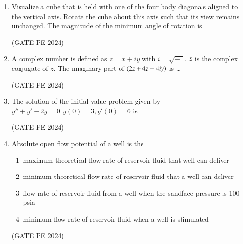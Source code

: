 \documentclass[journal,12pt,onecolumn]{IEEEtran}
\theoremstyle{remark}
\begin{document}
\begin{enumerate}
\item Visualize a cube that is held with one of the four body diagonals aligned to the vertical axis. Rotate the cube about this axis such that its view remains unchanged. The magnitude of the minimum angle of rotation is 
\begin{enumerate}
\end{enumerate}
\hfill{(GATE PE 2024)}

\item A complex number is defined as $z=x+iy$ with $i=\sqrt{-1}$. $\bar{z}$ is the complex conjugate of $z$. The imaginary part of $\left(2z+4\bar z+4iy\right)$ is \dots
\begin{enumerate}
\end{enumerate}
\hfill{(GATE PE 2024)}

\item The solution of the initial value problem given by\\
$y''+y'-2y=0;y(0)=3,y'(0)=6$ is
\begin{enumerate}
\end{enumerate}
\hfill{(GATE PE 2024)}

\item Absolute open flow potential of a well is the 
\begin{enumerate}
    \item maximum theoretical flow rate of reservoir fluid that well can deliver
    \item minimum theoretical flow rate of reservoir fluid that a well can deliver
    \item flow rate of reservoir fluid from a well when the sandface pressure is 100 psia
    \item minimum flow rate of reservoir fluid when a well is stimulated
\end{enumerate}
\hfill{(GATE PE 2024)}


\end{enumerate}
\end{document}
